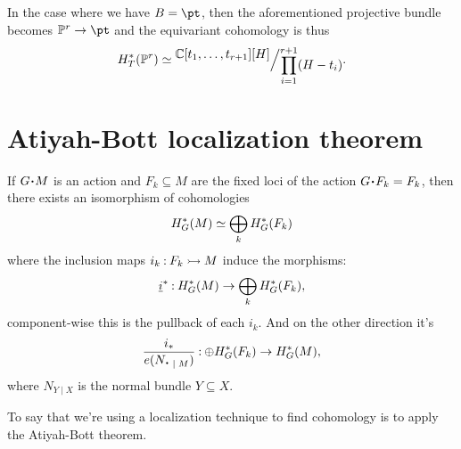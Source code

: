 \documentclass[12pt]{memoir}
\begin{document}
\begin{Ex}
    In the case where we have $B=\pt$, then the aforementioned projective bundle becomes $\bP^{r}\to\pt$ and the equivariant cohomology is thus 
    $$H^\ast_T(\bP^{r})\isom\quot{\bC[t_1,\dots,t_{r+1}][H]}{\prod_{i=1}^{r+1}(H-t_i)}.$$
\end{Ex}

\section{Atiyah-Bott localization theorem}

\begin{Th}
    If $G\.M$ is an action and $F_k\subseteq M$ are the fixed loci of the action $G\.F_k=F_k$, then there exists an isomorphism of cohomologies
    $$H^\ast_G(M)\simeq \bigoplus_kH^\ast_G(F_k)$$
    where the inclusion maps $i_k\mathbin{:} F_k\rightarrowtail M$ induce the morphisms:
    $$\underline{i}^\ast\mathbin{:}H^\ast_G(M)\to\bigoplus_kH^\ast_G(F_k),$$
    component-wise this is the pullback of each $i_k$. And on the other direction it's
 $$\frac{i_\ast}{e(N_{\.\mid M})}\:\oplus H^\ast_G(F_k)\to H^\ast_G(M),$$ 
 where $N_{Y\mid X}$ is the normal bundle $Y\subseteq X$.
\end{Th}

To say that we're using a localization technique to find cohomology is to apply the Atiyah-Bott theorem.
\end{document}
